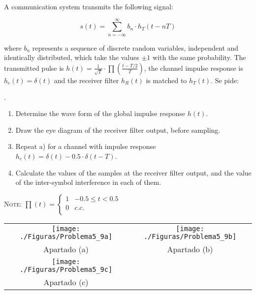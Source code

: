 \documentclass[en,boletin]{uah}
\begin{document}
{

A communication system transmits the following signal:

\begin{displaymath}
s(t) = \sum_{n=-\infty}^{\infty} b_n \cdot h_T(t-nT)
\end{displaymath}

where $b_n$ represents a sequence of discrete random variables, independent and identically distributed, which take the values $\pm 1$ with the same probability. The transmitted pulse is $h(t) = \frac{1}{\sqrt{T}} \cdot \prod \left ( \frac{t-T/2}{T} \right )$, the channel impulse response is $h_c(t)=\delta (t)$ and the receiver filter $h_R(t)$ is matched to $h_T(t)$. Se pide:


	.
	
	
	

\begin{enumerate}
	\item Determine the wave form of the global impulse response $h(t)$.
	\item Draw the eye diagram of the receiver filter output, before sampling.
	\item Repeat a) for a channel with impulse response $h_c(t)=\delta (t) - 0.5 \cdot \delta (t-T)$.
	\item Calculate the values of the samples at the receiver filter output, and the value of the inter-symbol interference in each of them.
\end{enumerate}

\textsc{Note:} $\prod(t) = \left \{ \begin{array}{ll} 1 & -0.5\leq t <0.5 \\ 0 & c.c. \\
 \end{array} \right.$
 \ \\

}
{

\begin{tabular}[h]{cc}
	\texttt{[image: ./Figuras/Problema5\_9a]} &
	\texttt{[image: ./Figuras/Problema5\_9b]} \\
	Apartado (a) & Apartado (b) \\
	\texttt{[image: ./Figuras/Problema5\_9c]} &
	\\
	Apartado (c) & \\
\end{tabular}

}
\end{document}
